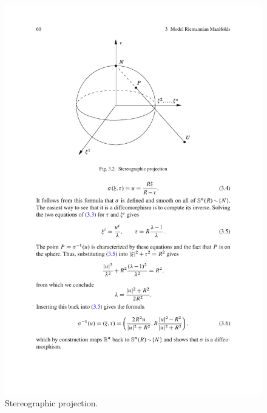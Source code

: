\begin{figure}[htbp]
\centering
\includegraphics{pictures/stereographic-projection}
\caption{Stereographic projection.}
\end{figure}

